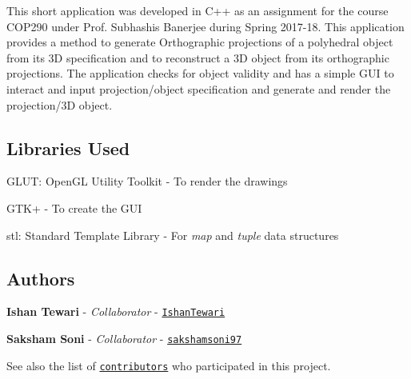 This short application was developed in C++ as an assignment for the course C\+O\+P290 under Prof. Subhashis Banerjee during Spring 2017-\/18. This application provides a method to generate Orthographic projections of a polyhedral object from its 3D specification and to reconstruct a 3D object from its orthographic projections. The application checks for object validity and has a simple G\+UI to interact and input projection/object specification and generate and render the projection/3D object.

\subsection*{Libraries Used}


\begin{DoxyItemize}
\item G\+L\+UT\+: Open\+GL Utility Toolkit -\/ To render the drawings
\item G\+T\+K+ -\/ To create the G\+UI
\item stl\+: Standard Template Library -\/ For {\itshape map} and {\itshape tuple} data structures
\end{DoxyItemize}

\subsection*{Authors}


\begin{DoxyItemize}
\item {\bfseries Ishan Tewari} -\/ {\itshape Collaborator} -\/ \href{https://github.com/IshanTewari}{\tt Ishan\+Tewari}
\item {\bfseries Saksham Soni} -\/ {\itshape Collaborator} -\/ \href{https://github.com/sakshamsoni97}{\tt sakshamsoni97}
\end{DoxyItemize}

See also the list of \href{https://github.com/your/project/contributors}{\tt contributors} who participated in this project. 